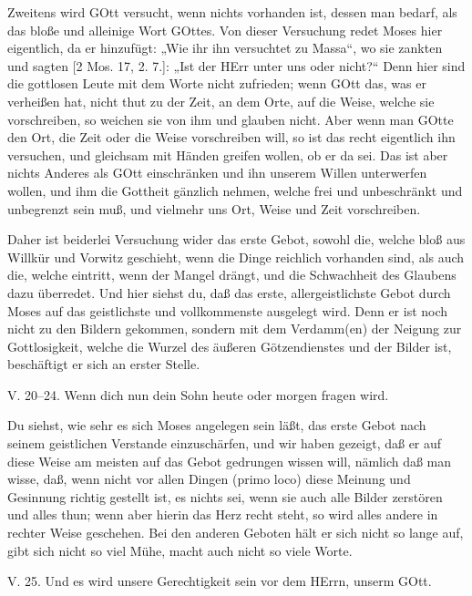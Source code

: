 Zweitens wird GOtt versucht, wenn nichts vorhanden ist, dessen man bedarf, als das bloße und alleinige Wort GOttes. Von dieser Versuchung redet Moses hier eigentlich, da er hinzufügt: „Wie ihr ihn versuchtet zu Massa“, wo sie zankten und sagten [2 Mos. 17, 2. 7.]: „Ist der HErr unter uns oder nicht?“ Denn hier sind die gottlosen Leute mit dem Worte nicht zufrieden; wenn GOtt das, was er verheißen hat, nicht thut zu der Zeit, an dem Orte, auf die Weise, welche sie vorschreiben, so weichen sie von ihm und glauben nicht. Aber wenn man GOtte den Ort, die Zeit oder die Weise vorschreiben will, so ist das recht eigentlich ihn versuchen, und gleichsam mit Händen greifen wollen, ob er da sei. Das ist aber nichts Anderes als GOtt einschränken und ihn unserem Willen unterwerfen wollen, und ihm die Gottheit gänzlich nehmen, welche frei und unbeschränkt und unbegrenzt sein muß, und vielmehr uns Ort, Weise und Zeit vorschreiben.

Daher ist beiderlei Versuchung wider das erste Gebot, sowohl die, welche bloß aus Willkür und Vorwitz geschieht, wenn die Dinge reichlich vorhanden sind, als auch die, welche eintritt, wenn der Mangel drängt, und die Schwachheit des Glaubens dazu überredet. Und hier siehst du, daß das erste, allergeistlichste Gebot durch Moses auf das geistlichste und vollkommenste ausgelegt wird. Denn er ist noch nicht zu den Bildern gekommen, sondern mit dem Verdamm(en) der Neigung zur Gottlosigkeit, welche die Wurzel des äußeren Götzendienstes und der Bilder ist, beschäftigt er sich an erster Stelle.

\begin{schriftzitat}
V. 20–24. Wenn dich nun dein Sohn heute oder morgen fragen wird.
\end{schriftzitat}

Du siehst, wie sehr es sich Moses angelegen sein läßt, das erste Gebot nach seinem geistlichen Verstande einzuschärfen, und wir haben gezeigt, daß er auf diese Weise am meisten auf das Gebot gedrungen wissen will, nämlich daß man wisse, daß, wenn nicht vor allen Dingen (primo loco) diese Meinung und Gesinnung richtig gestellt ist, es nichts sei, wenn sie auch alle Bilder zerstören und alles thun; wenn aber hierin das Herz recht steht, so wird alles andere in rechter Weise geschehen. Bei den anderen Geboten hält er sich nicht so lange auf, gibt sich nicht so viel Mühe, macht auch nicht so viele Worte.

\begin{schriftzitat}
V. 25. Und es wird unsere Gerechtigkeit sein vor dem HErrn, unserm GOtt.
\end{schriftzitat}

